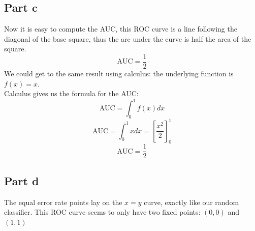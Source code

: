 \documentclass[a4paper, 10pt]{article}
\begin{document}
\subsection{Part c}
Now it is easy to compute the AUC, this ROC curve is a line
following the diagonal of the base square, thus the are under the curve is
half the area of the square.
$$
\text{AUC} = \frac{1}{2}
$$
We could get to the same result using calculus: the underlying function
is $f(x) = x$.
\\
Calculus gives us the formula for the AUC:
$$
\text{AUC} = \int_0^1 f(x) dx
$$
$$
\text{AUC} = \int_0^1 x dx = \left[\frac{x^2}{2} \right]_0^1 
$$
$$
\text{AUC} = \frac{1}{2}
$$

\subsection{Part d}
The equal error rate points lay on the $x=y$ curve, exactly like our random classifier.
This ROC curve seems to only have two fixed points: $(0,0)$ and $(1,1)$
\end{document}

